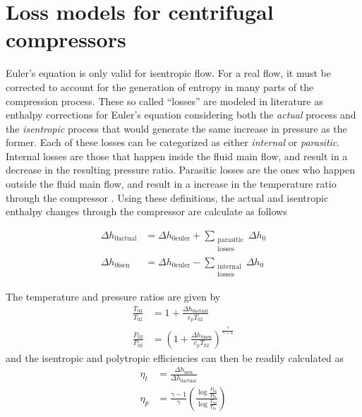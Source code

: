 \section{Loss models for centrifugal compressors}
\label{sec:compressor_losses}
Euler's equation is only valid for isentropic flow. 
For a real flow, it must be corrected to account for the generation of entropy in many parts of the compression process. 
These so called ``losses'' are modeled in literature as enthalpy corrections 
for Euler's equation considering both the \emph{actual} process and the \emph{isentropic} process 
that would generate the same increase in pressure as the former.
Each of these losses can be categorized as either \emph{internal} or \emph{parasitic}.
Internal losses are those that happen inside the fluid main flow, and result in a decrease in the resulting pressure ratio.
Parasitic losses are the ones who happen outside the fluid main flow, 
and result in a increase in the temperature ratio through the compressor \cite{Galvas1973}.
Using these definitions, the actual and isentropic enthalpy changes through the compressor are calculate as follows

\begin{align}
    \Delta h_{0\text{actual}} &= \Delta h_{0\text{euler}} + \sum_{\substack{
                                                            \text{parasitic} \\ 
                                                            \text{losses}
                                                        }}
                                                          \Delta h_0 \\
    \Delta h_{0\text{isen}}  &= \Delta h_{0\text{euler}} - \sum_{\substack{
                                                            \text{internal} \\ 
                                                            \text{losses}
                                                        }}
                                                          \Delta h_0
\end{align}

The temperature and pressure ratios are given by
\begin{align}
    \frac{T_{03}}{T_{02}} &= 1 + \frac{\Delta h_{0\text{actual}}}{c_p T_{02}} \\
    \frac{P_{03}}{P_{02}} &= \left( 1 + \frac{\Delta h_{0\text{isen}}}{c_p T_{02}}\right)^{\frac{\gamma}{\gamma-1}}
\end{align}
and the isentropic and polytropic efficiencies can then be readily calculated as
\begin{align}
    \eta_t &= \frac{\Delta h_{\text{isen}}}{\Delta h_{0\text{actual}}}\\
    \eta_p &= \frac{\gamma-1}{\gamma} \left(\frac{\log\frac{P_{02}}{P_{01}}}
                                                 {\log\frac{T_{02}}{T_{01}}}
                                     \right)
\end{align}


